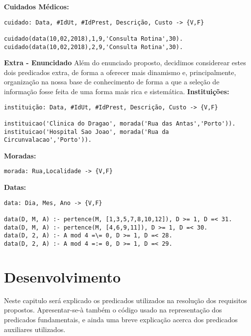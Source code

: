 \documentclass{report}
\begin{document}
\textbf{Cuidados Médicos:}
\begin{verbatim}
cuidado: Data, #IdUt, #IdPrest, Descrição, Custo -> {V,F}

cuidado(data(10,02,2018),1,9,'Consulta Rotina',30).
cuidado(data(10,02,2018),2,9,'Consulta Rotina',30).

\end{verbatim}

\textbf{Extra - Enuncidado}
\bigbreak
Além do enunciado proposto, decidimos considerear estes dois predicados extra, de forma a oferecer mais dinamismo e, principalmente, organização na nossa base de conhecimento de forma a que a seleção de informação fosse feita de uma forma mais rica e sistemática.
\bigbreak
\textbf{Instituições:}
\begin{verbatim}
instituição: Data, #IdUt, #IdPrest, Descrição, Custo -> {V,F}

instituicao('Clinica do Dragao', morada('Rua das Antas','Porto')).
instituicao('Hospital Sao Joao', morada('Rua da Circunvalacao','Porto')).
\end{verbatim}

\textbf{Moradas:}
\begin{verbatim}
morada: Rua,Localidade -> {V,F}

\end{verbatim}

\textbf{Datas:}
\begin{verbatim}
data: Dia, Mes, Ano -> {V,F}

data(D, M, A) :- pertence(M, [1,3,5,7,8,10,12]), D >= 1, D =< 31.
data(D, M, A) :- pertence(M, [4,6,9,11]), D >= 1, D =< 30.
data(D, 2, A) :- A mod 4 =\= 0, D >= 1, D =< 28.
data(D, 2, A) :- A mod 4 =:= 0, D >= 1, D =< 29.
\end{verbatim}


\chapter{Desenvolvimento} \label{intro}
 

Neste capitulo será explicado os predicados utilizados na resolução dos requisitos propostos. Apresentar-se-à também o código usado na representação dos predicados fundamentais, e ainda uma breve explicação acerca dos predicados auxiliares utilizados.
 
\end{document}
